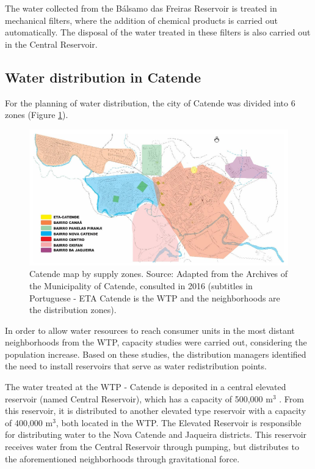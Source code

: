 \documentclass{singlecol}
\theoremstyle{TH}{
\newtheorem{lemma}{Lemma}
\newtheorem{theorem}[lemma]{Theorem}
\newtheorem{corrolary}[lemma]{Corrolary}
\newtheorem{conjecture}[lemma]{Conjecture}
\newtheorem{proposition}[lemma]{Proposition}
\newtheorem{claim}[lemma]{Claim}
\newtheorem{stheorem}[lemma]{Wrong Theorem}
\newtheorem{algorithm}{Algorithm}
}
\theoremstyle{THrm}{
\newtheorem{definition}{Definition}[section]
\newtheorem{question}{Question}[section]
\newtheorem{remark}{Remark}
\newtheorem{scheme}{Scheme}
}
\theoremstyle{THhit}{
\newtheorem{case}{Case}[section]
}
\begin{document}
The water collected from the Bálsamo das Freiras Reservoir is treated in mechanical filters, where the addition of chemical products is carried out automatically. The disposal of the water treated in these filters is also carried out in the Central Reservoir. 

\subsection{Water distribution in Catende}

For the planning of water distribution, the city of Catende was divided into 6 zones (Figure \ref{fig:SectorsCatende}). 

\begin{figure}[h]
\caption{Catende map by supply zones. Source: Adapted from the Archives of the Municipality of Catende, consulted in 2016 (subtitles in Portuguese - ETA Catende is the WTP and the neighborhoods are the distribution zones).}
\label{fig:SectorsCatende}
\centering
\includegraphics[width=\textwidth]{figures/setores.png}
\end{figure}
 
In order to allow water resources to reach consumer units in the most distant neighborhoods from the WTP, capacity studies were carried out, considering the population increase. Based on these studies, the distribution managers identified the need to install reservoirs that serve as water redistribution points. 

The water treated at the WTP - Catende is deposited in a central elevated reservoir (named Central Reservoir), which has a capacity of 500,000 m$^3$ . From this reservoir, it is distributed to another elevated type reservoir with a capacity of 400,000 m$^3$, both located in the WTP. The Elevated Reservoir is responsible for distributing water to the Nova Catende and Jaqueira districts. This reservoir receives water from the
Central Reservoir through pumping, but distributes to the aforementioned neighborhoods through gravitational force. 
\end{document}
